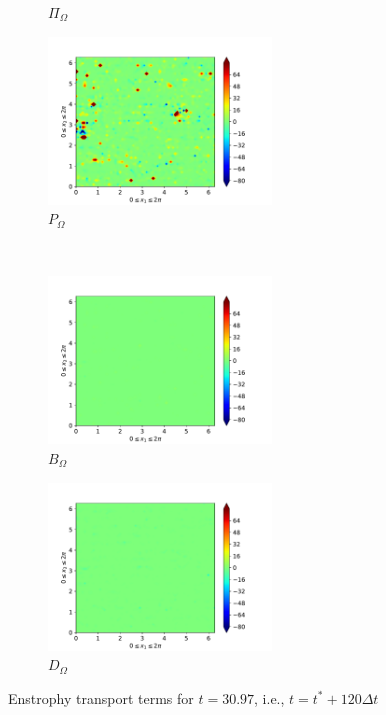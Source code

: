 \begin{figure}[H]
\begin{subfigure}{0.45\textwidth}
        \caption{$\Pi_{\Omega}$}
    \end{subfigure}
    \newline
    \begin{subfigure}{0.45\textwidth}
        \includegraphics[height=1.75in]{media/run-cds-65/P-enst-1460}
        \caption{$P_{\Omega}$}
    \end{subfigure}
    ~
    \begin{subfigure}{0.45\textwidth}
        \includegraphics[height=1.75in]{media/run-cds-65/B-enst-1460}
        \caption{$B_{\Omega}$}
    \end{subfigure}
    \newline
    \begin{subfigure}{0.45\textwidth}
        \includegraphics[height=1.75in]{media/run-cds-65/D-enst-1460}
        \caption{$D_{\Omega}$}
    \end{subfigure}
    \caption{Enstrophy transport terms for $t=30.97$, i.e., $t=t^{\ast} + 120 \Delta t$}
\end{figure}

\newpage

